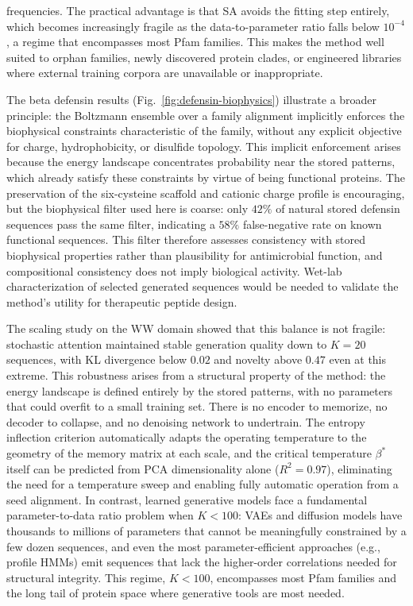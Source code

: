 frequencies. The practical advantage is that SA avoids the fitting step entirely, which becomes increasingly fragile as the data-to-parameter ratio falls below $10^{-4}$, a regime that encompasses most Pfam families. This makes the method well suited to orphan families, newly discovered protein clades, or engineered libraries where external training corpora are unavailable or inappropriate.

The beta defensin results (Fig.~\ref{fig:defensin-biophysics}) illustrate a broader principle: the Boltzmann ensemble over a family alignment implicitly enforces the biophysical constraints characteristic of the family, without any explicit objective for charge, hydrophobicity, or disulfide topology. This implicit enforcement arises because the energy landscape concentrates probability near the stored patterns, which already satisfy these constraints by virtue of being functional proteins. The preservation of the six-cysteine scaffold and cationic charge profile is encouraging, but the biophysical filter used here is coarse: only $42\%$ of natural stored defensin sequences pass the same filter, indicating a $58\%$ false-negative rate on known functional sequences. This filter therefore assesses consistency with stored biophysical properties rather than plausibility for antimicrobial function, and compositional consistency does not imply biological activity. Wet-lab characterization of selected generated sequences would be needed to validate the method's utility for therapeutic peptide design.

The scaling study on the WW domain showed that this balance is not fragile: stochastic attention maintained stable generation quality down to $K{=}20$ sequences, with KL divergence below $0.02$ and novelty above $0.47$ even at this extreme. This robustness arises from a structural property of the method: the energy landscape is defined entirely by the stored patterns, with no parameters that could overfit to a small training set. There is no encoder to memorize, no decoder to collapse, and no denoising network to undertrain. The entropy inflection criterion automatically adapts the operating temperature to the geometry of the memory matrix at each scale, and the critical temperature $\beta^*$ itself can be predicted from PCA dimensionality alone ($R^2{=}0.97$), eliminating the need for a temperature sweep and enabling fully automatic operation from a seed alignment. In contrast, learned generative models face a fundamental parameter-to-data ratio problem when $K < 100$: VAEs and diffusion models have thousands to millions of parameters that cannot be meaningfully constrained by a few dozen sequences, and even the most parameter-efficient approaches (e.g., profile HMMs) emit sequences that lack the higher-order correlations needed for structural integrity. This regime, $K < 100$, encompasses most Pfam families and the long tail of protein space where generative tools are most needed.

